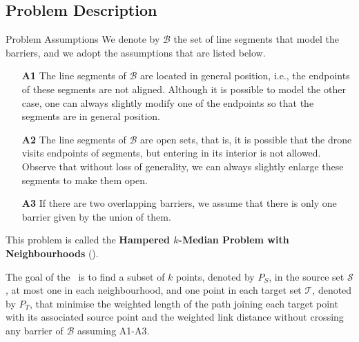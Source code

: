 \documentclass[slidestop,usepdftitle=false,10pt]{beamer}
\newcommand{\KMPHN}{{\sf{H-KMPHN}}}
\newcommand{\KMPN}{{\sf{H-KMPN}\xspace }}
\newcommand{\SPPN}{{\sf{H-SPPN}\xspace }}
\begin{document}
	\subsection{Problem Description}
	\begin{frame}{Problem Assumptions}
		\footnotesize
		We denote by $\mathcal{B}$ the set of line segments that model the barriers, and we adopt the  assumptions that are listed below.
		\begin{enumerate}
			\item[\textbf{A1}] \label{A1}The line segments of $\mathcal B$ are located in general position, i.e., the endpoints of these segments are not aligned. Although it is possible to model the other case, one can always slightly modify one of the endpoints so that the segments are in general position.
			\item[\textbf{A2}] The line segments of $\mathcal B$ are open sets, that is, it is possible that the drone visits endpoints of segments, but entering  in its interior is not allowed. Observe that without loss of generality, we can always slightly enlarge these segments to make them open.
			\item[\textbf{A3}] \label{A3}If there are two overlapping barriers, we assume that there is only one barrier given by the union of them.
		\end{enumerate}
		This problem is called the \textbf{Hampered $k$-Median Problem with Neighbourhoods} (\KMPN). 
		
		\medskip
		
		The goal of the \KMPN \ is to find a subset of $k$ points, denoted by $P_S$, in the source set $\mathcal S$, at most one in each neighbourhood, and one point in each target set $\mathcal T$, denoted by $P_T$, that minimise the weighted length of the path joining each target point with its associated source point and the weighted link distance without crossing any barrier of $\mathcal B$ assuming A1-A3. 
		
	\end{frame}
\end{document}
